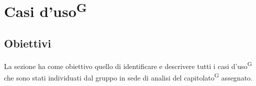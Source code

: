 \section{Casi d'uso\textsuperscript{G}}



\subsection{Obiettivi}
La sezione ha come obiettivo quello di identificare e descrivere tutti i casi d'uso\textsuperscript{G} che sono stati individuati dal gruppo in sede di analisi del capitolato\textsuperscript{G} assegnato.


